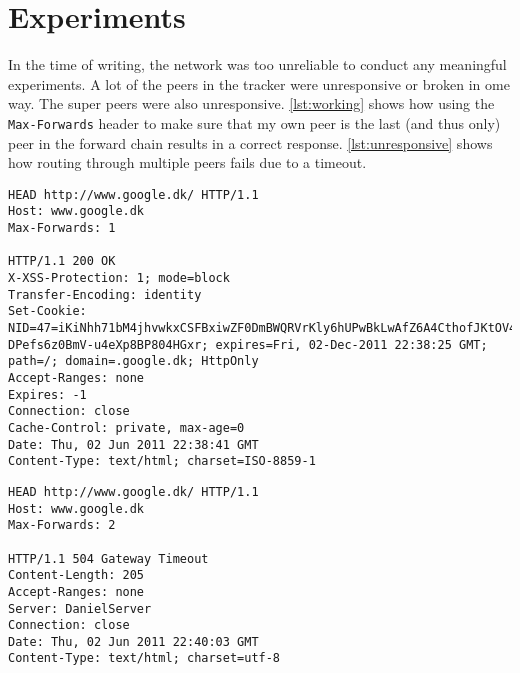 \documentclass{sig-alternate}
\begin{document}
\section{Experiments}
\label{sec:experiments}

In the time of writing, the network was too unreliable to conduct
any meaningful experiments. A lot of the peers in the tracker were
unresponsive or broken in ome way. The super peers were also unresponsive.
\autoref{lst:working} shows how using the \verb+Max-Forwards+ header to make
sure that my own peer is the last (and thus only) peer in the forward chain
results in a correct response. \autoref{lst:unresponsive} shows how routing
through multiple peers fails due to a timeout.

\begin{lstlisting}
HEAD http://www.google.dk/ HTTP/1.1
Host: www.google.dk
Max-Forwards: 1

HTTP/1.1 200 OK
X-XSS-Protection: 1; mode=block
Transfer-Encoding: identity
Set-Cookie: NID=47=iKiNhh71bM4jhvwkxCSFBxiwZF0DmBWQRVrKly6hUPwBkLwAfZ6A4CthofJKtOV4ZD43xZlsIogZqt1dp84GYFl8Awg_Zp9d6gro-DPefs6z0BmV-u4eXp8BP804HGxr; expires=Fri, 02-Dec-2011 22:38:25 GMT; path=/; domain=.google.dk; HttpOnly
Accept-Ranges: none
Expires: -1
Connection: close
Cache-Control: private, max-age=0
Date: Thu, 02 Jun 2011 22:38:41 GMT
Content-Type: text/html; charset=ISO-8859-1
\end{lstlisting}

\begin{lstlisting}
HEAD http://www.google.dk/ HTTP/1.1
Host: www.google.dk
Max-Forwards: 2

HTTP/1.1 504 Gateway Timeout
Content-Length: 205
Accept-Ranges: none
Server: DanielServer
Connection: close
Date: Thu, 02 Jun 2011 22:40:03 GMT
Content-Type: text/html; charset=utf-8
\end{lstlisting}


%

\end{document}
